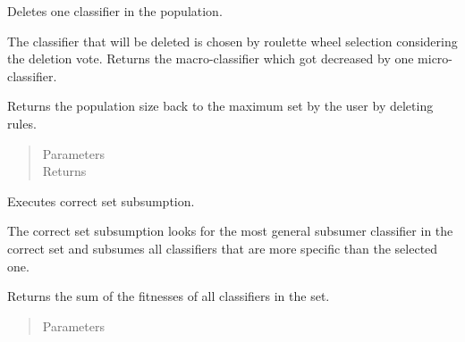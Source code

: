 \documentclass[letterpaper,10pt,english]{sphinxmanual}
\begin{document}
\begin{fulllineitems}
\begin{fulllineitems}
\label{\detokenize{eLCS:eLCS.ClassifierSet.ClassifierSet.deleteFromPopulation}}
Deletes one classifier in the population.

The classifier that will be deleted is chosen by roulette wheel selection considering the deletion vote.
Returns the macro-classifier which got decreased by one micro-classifier.

\end{fulllineitems}


\begin{fulllineitems}
\label{\detokenize{eLCS:eLCS.ClassifierSet.ClassifierSet.deletion}}
Returns the population size back to the maximum set by the user by deleting rules.
\begin{quote}\begin{description}
\item[{Parameters}] \leavevmode
{} \textendash{} 

\item[{Returns}] \leavevmode


\end{description}\end{quote}

\end{fulllineitems}


\begin{fulllineitems}
\label{\detokenize{eLCS:eLCS.ClassifierSet.ClassifierSet.doCorrectSetSubsumption}}
Executes correct set subsumption.

The correct set subsumption looks for the most general subsumer classifier in the correct set
and subsumes all classifiers that are more specific than the selected one.

\end{fulllineitems}


\begin{fulllineitems}
\label{\detokenize{eLCS:eLCS.ClassifierSet.ClassifierSet.getFitnessSum}}
Returns the sum of the fitnesses of all classifiers in the set.
\begin{quote}\begin{description}
\item[{Parameters}] \leavevmode
{} \textendash{} 


\end{description}
\end{quote}
\end{fulllineitems}
\end{fulllineitems}
\end{document}
